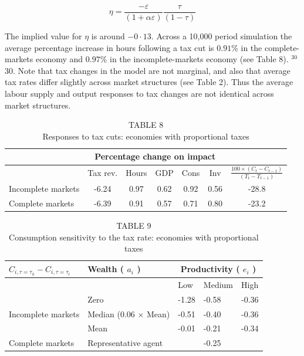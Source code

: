 \documentclass[11pt]{article}
\begin{document}
$$
\eta=\frac{-\varepsilon}{(1+\alpha \varepsilon)} \frac{\tau}{(1-\tau)}
$$

The implied value for $\eta$ is around $-0 \cdot 13$. Across a 10,000 period simulation the average percentage increase in hours following a tax cut is $0.91 \%$ in the complete-markets economy and $0.97 \%$ in the incomplete-markets economy (see Table 8). ${ }^{30}$\\
30. Note that tax changes in the model are not marginal, and also that average tax rates differ slightly across market structures (see Table 2). Thus the average labour supply and output responses to tax changes are not identical across market structures.

\begin{table}[h]
\begin{center}
\captionsetup{labelformat=empty}
\caption{TABLE 8\\
Responses to tax cuts: economies with proportional taxes}
\begin{tabular}{lcccccc}
\hline
 & \multicolumn{5}{c}{Percentage change on impact} &  \\
\hline
 & Tax rev. & Hours & GDP & Cons & Inv & $\frac{100 \times\left(C_{t}-C_{t-1}\right)}{\left(T_{t}-T_{t-1}\right)}$ \\
Incomplete markets & -6.24 & 0.97 & 0.62 & 0.92 & 0.56 & -28.8 \\
Complete markets & -6.39 & 0.91 & 0.57 & 0.71 & 0.80 & -23.2 \\
\hline
\end{tabular}
\end{center}
\end{table}

\begin{table}[h]
\begin{center}
\captionsetup{labelformat=empty}
\caption{TABLE 9\\
Consumption sensitivity to the tax rate: economies with proportional taxes}
\begin{tabular}{|l|l|l|l|l|}
\hline
\multirow[b]{2}{*}{$C_{i, \tau=\tau_{h}}-C_{i, \tau=\tau_{l}}$} & \multirow[b]{2}{*}{Wealth ( $a_{i}$ )} & \multicolumn{3}{|c|}{Productivity ( $e_{i}$ )} \\
\hline
 &  & Low & Medium & High \\
\hline
\multirow{3}{*}{Incomplete markets} & Zero & -1.28 & -0.58 & -0.36 \\
\hline
 & Median (0.06 × Mean) & -0.51 & -0.40 & -0.36 \\
\hline
 & Mean & -0.01 & -0.21 & -0.34 \\
\hline
Complete markets & Representative agent &  & -0.25 &  \\
\hline
\end{tabular}
\end{center}
\end{table}
\end{document}
